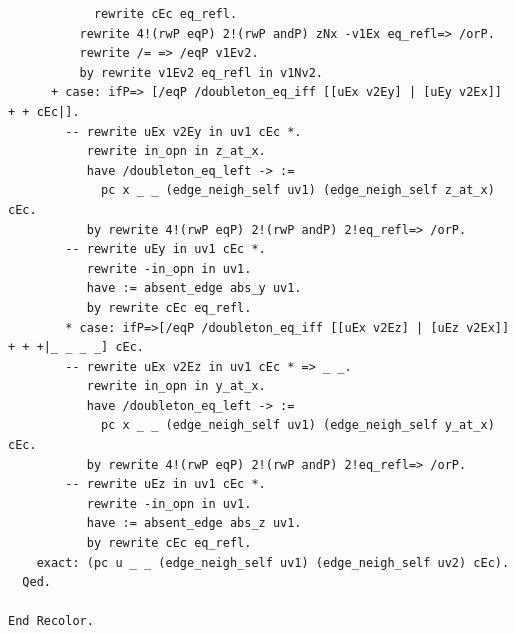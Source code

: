 \begin{verbatim}
            rewrite cEc eq_refl.
          rewrite 4!(rwP eqP) 2!(rwP andP) zNx -v1Ex eq_refl=> /orP.
          rewrite /= => /eqP v1Ev2. 
          by rewrite v1Ev2 eq_refl in v1Nv2.
      + case: ifP=> [/eqP /doubleton_eq_iff [[uEx v2Ey] | [uEy v2Ex]] + + cEc|].
        -- rewrite uEx v2Ey in uv1 cEc *.
           rewrite in_opn in z_at_x.
           have /doubleton_eq_left -> :=
             pc x _ _ (edge_neigh_self uv1) (edge_neigh_self z_at_x) cEc.
           by rewrite 4!(rwP eqP) 2!(rwP andP) 2!eq_refl=> /orP.
        -- rewrite uEy in uv1 cEc *.
           rewrite -in_opn in uv1.
           have := absent_edge abs_y uv1.
           by rewrite cEc eq_refl.
        * case: ifP=>[/eqP /doubleton_eq_iff [[uEx v2Ez] | [uEz v2Ex]] + + +|_ _ _ _] cEc.
        -- rewrite uEx v2Ez in uv1 cEc * => _ _.
           rewrite in_opn in y_at_x.
           have /doubleton_eq_left -> :=
             pc x _ _ (edge_neigh_self uv1) (edge_neigh_self y_at_x) cEc.
           by rewrite 4!(rwP eqP) 2!(rwP andP) 2!eq_refl=> /orP.
        -- rewrite uEz in uv1 cEc *.
           rewrite -in_opn in uv1.
           have := absent_edge abs_z uv1.
           by rewrite cEc eq_refl.
    exact: (pc u _ _ (edge_neigh_self uv1) (edge_neigh_self uv2) cEc). 
  Qed.

End Recolor.
\end{verbatim}


